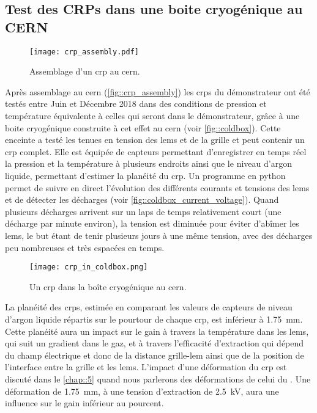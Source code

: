     \subsection{Test des CRPs dans une boite cryogénique au CERN}\label{sec::cold_box}
      
      \begin{figure}
        \centering
        \texttt{[image: crp\_assembly.pdf]}
        \caption[Assemblage d'un CRP au CERN]{\label{fig::crp_assembly}Assemblage d'un \gls{crp} au \gls{cern}.}
      \end{figure}

      Après assemblage au \gls{cern} (\autoref{fig::crp_assembly}) les  \glspl{crp} du démonstrateur \SSS{} ont été testés entre Juin et Décembre 2018 dans des conditions de pression et température équivalente à celles qui seront dans le démonstrateur, grâce à une boite cryogénique construite à cet effet au \gls{cern} (voir \autoref{fig::coldbox}). Cette enceinte a testé les tenues en tension des \glspl{lem} et de la grille et peut contenir un \gls{crp} complet. Elle est équipée de capteurs permettant d'enregistrer en temps réel la pression et la température à plusieurs endroits ainsi que le niveau d'argon liquide, permettant d'estimer la planéité du \gls{crp}. 
      Un programme en python permet de suivre en direct l'évolution des différents courants et tensions des \glspl{lem} et de détecter les décharges (voir \autoref{fig::coldbox_current_voltage}). Quand plusieurs décharges arrivent sur un laps de temps relativement court (une décharge par minute environ), la tension est diminuée pour éviter d'abîmer les \glspl{lem}, le but étant de tenir plusieurs jours à une même tension, avec des décharges peu nombreuses et très espacées en temps.

      \begin{figure}[!htb]
        \centering
        \texttt{[image: crp\_in\_coldbox.png]}
        \caption[Un CRP dans la boîte cryogénique au CERN]{\label{fig::coldbox}Un \gls{crp} dans la boîte cryogénique au \gls{cern}.}
      \end{figure}

      La planéité des \glspl{crp}, estimée en comparant les valeurs de capteurs de niveau d'argon liquide répartis sur le pourtour de chaque \gls{crp}, est inférieur à \SI{1.75}{\milli\meter}. Cette planéité aura un impact sur le gain à travers la température dans les \glspl{lem}, qui suit un gradient dans le gaz, et à travers l'efficacité d'extraction qui dépend du champ électrique et donc de la distance grille-\gls{lem} ainsi que de la position de l'interface entre la grille et les \glspl{lem}. L'impact d'une déformation du \gls{crp} est discuté dans le \autoref{chap::5} quand nous parlerons des déformations de celui du \TOO{}. Une déformation de \SI{1.75}{\milli\meter}, à une tension d'extraction de \SI{2.5}{\kilo\volt}, aura une influence sur le gain inférieur au pourcent.

